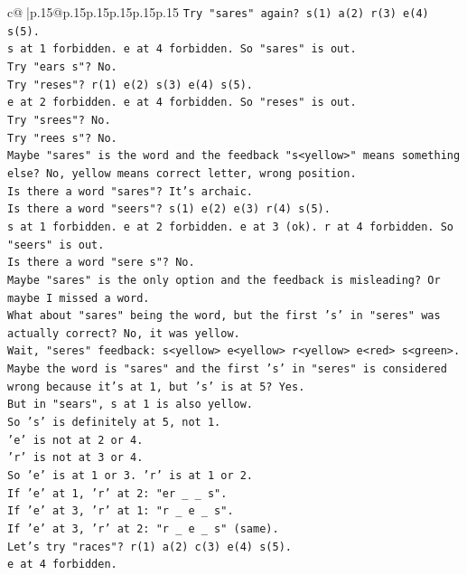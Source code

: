 \documentclass{article}
\begin{document}
{\begin{supertabular}{c@{$\;$}|p{.15\linewidth}@{}p{.15\linewidth}p{.15\linewidth}p{.15\linewidth}p{.15\linewidth}p{.15\linewidth}}
{{{\texttt{Try "sares" again? s(1) a(2) r(3) e(4) s(5).} \\
\texttt{s at 1 forbidden. e at 4 forbidden. So "sares" is out.} \\
\texttt{Try "ears s"? No.} \\
\texttt{Try "reses"? r(1) e(2) s(3) e(4) s(5).} \\
\texttt{e at 2 forbidden. e at 4 forbidden. So "reses" is out.} \\
\texttt{Try "srees"? No.} \\
\texttt{Try "rees s"? No.} \\
\texttt{Maybe "sares" is the word and the feedback "s<yellow>" means something else? No, yellow means correct letter, wrong position.} \\
\texttt{Is there a word "sares"? It's archaic.} \\
\texttt{Is there a word "seers"? s(1) e(2) e(3) r(4) s(5).} \\
\texttt{s at 1 forbidden. e at 2 forbidden. e at 3 (ok). r at 4 forbidden. So "seers" is out.} \\
\texttt{Is there a word "sere s"? No.} \\
\texttt{Maybe "sares" is the only option and the feedback is misleading? Or maybe I missed a word.} \\
\texttt{What about "sares" being the word, but the first 's' in "seres" was actually correct? No, it was yellow.} \\
\texttt{Wait, "seres" feedback: s<yellow> e<yellow> r<yellow> e<red> s<green>.} \\
\texttt{Maybe the word is "sares" and the first 's' in "seres" is considered wrong because it's at 1, but 's' is at 5? Yes.} \\
\texttt{But in "sears", s at 1 is also yellow.} \\
\texttt{So 's' is definitely at 5, not 1.} \\
\texttt{'e' is not at 2 or 4.} \\
\texttt{'r' is not at 3 or 4.} \\
\texttt{So 'e' is at 1 or 3. 'r' is at 1 or 2.} \\
\texttt{If 'e' at 1, 'r' at 2: "er \_ \_ s".} \\
\texttt{If 'e' at 3, 'r' at 1: "r \_ e \_ s".} \\
\texttt{If 'e' at 3, 'r' at 2: "r \_ e \_ s" (same).} \\
\texttt{Let's try "races"? r(1) a(2) c(3) e(4) s(5).} \\
\texttt{e at 4 forbidden.} \\
}}}
\end{supertabular}}
\end{document}
